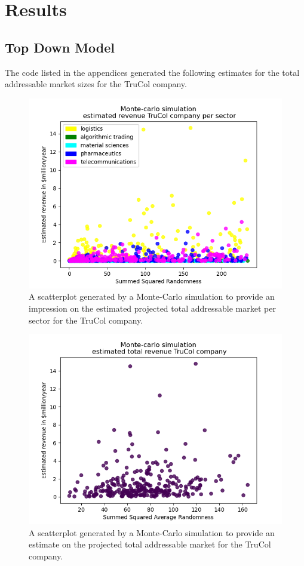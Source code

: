 \section{Results}\label{sec:results}
\subsection{Top Down Model}\label{subsec:results_top_down}
The code listed in the appendices generated the following estimates for the total addressable market sizes for the TruCol company.
\begin{figure}[H]
    \centering
    \includegraphics[width=0.5\linewidth]{Images/revenue_per_sector.png}
    \caption{A scatterplot generated by a Monte-Carlo simulation to provide an impression on the estimated projected total addressable market per sector for the TruCol company.}
    \label{fig:per_sector}
\end{figure}

\begin{figure}[H]
    \centering
    \includegraphics[width=0.5\linewidth]{Images/revenue_sum.png}
    \caption{A scatterplot generated by a Monte-Carlo simulation to provide an estimate on the projected total addressable market for the TruCol company.}
    \label{fig:summed}
\end{figure}
